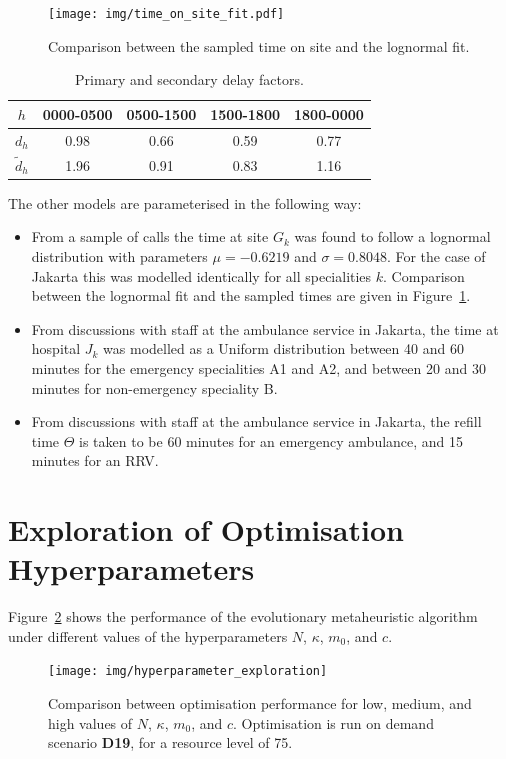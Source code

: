 \documentclass[numbers,webpdf,imaman]{ima-authoring-template}%
\begin{document}
\begin{figure}[b]
\centering
  \texttt{[image: img/time\_on\_site\_fit.pdf]}
    \caption{Comparison between the sampled time on site and the lognormal fit.}
  \label{fig:lognorm_fit}
\end{figure}

\begin{table}[b]
\begin{tabular}{ccccc}
\toprule
$h$ & 0000-0500 & 0500-1500 & 1500-1800 & 1800-0000 \\
\midrule
$d_h$ & 0.98 & 0.66 & 0.59 & 0.77 \\
$\tilde{d}_h$ & 1.96 & 0.91 & 0.83 & 1.16 \\
\bottomrule
\end{tabular}
\caption{Primary and secondary delay factors.}
\label{tbl:delay_factors}
\end{table}


The other models are parameterised in the following way:
\begin{itemize}
  \item From a sample of calls the time at site $G_k$ was found to follow a
        lognormal distribution with parameters $\mu=-0.6219$ and $\sigma=0.8048$.
        For the case of Jakarta this was modelled identically for all
        specialities $k$. Comparison between the lognormal fit and the sampled
        times are given in Figure~\ref{fig:lognorm_fit}.
  \item From discussions with staff at the ambulance service in Jakarta, the
        time at hospital $J_k$ was modelled as a Uniform distribution between
        40 and 60 minutes for the emergency specialities A1 and A2, and
        between 20 and 30 minutes for non-emergency speciality B.
  \item From discussions with staff at the ambulance service in Jakarta, the
        refill time $\Theta$ is taken to be 60 minutes for an emergency
        ambulance, and 15 minutes for an RRV.
\end{itemize}


\section{Exploration of Optimisation Hyperparameters}\label{apx:hyperparameters}
Figure~\ref{fig:hyperparameters_exploration} shows the performance of the
evolutionary metaheuristic algorithm under different values of the
hyperparameters $N$, $\kappa$, $m_0$, and $c$.

\begin{figure}
\centering
\texttt{[image: img/hyperparameter\_exploration]}
\caption{Comparison between optimisation performance for low, medium, and high
values of $N$, $\kappa$, $m_0$, and $c$. Optimisation is run on demand
scenario \textbf{D19}, for a resource level of 75.}
\label{fig:hyperparameters_exploration}
\end{figure}
\end{document}
